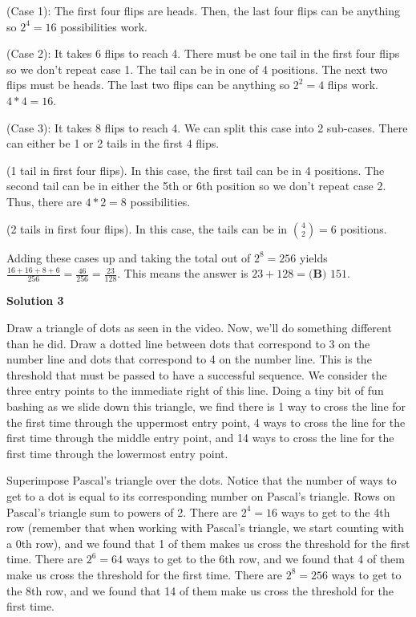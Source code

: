 \begin{enumerate}
 (Case 1): The first four flips are heads. Then, the last four flips can be anything so $2^4=16$ possibilities work. 

 (Case 2): It takes 6 flips to reach 4. There must be one tail in the first four flips so we don't repeat case 1. The tail can be in one of 4 positions. The next two flips must be heads. The last two flips can be anything so $2^2=4$ flips work. $4*4=16$. 

 (Case 3): It takes 8 flips to reach 4. We can split this case into 2 sub-cases. There can either be 1 or 2 tails in the first 4 flips. 

 (1 tail in first four flips). In this case, the first tail can be in 4 positions. The second tail can be in either the 5th or 6th position so we don't repeat case 2. Thus, there are $4*2=8$ possibilities.  

 (2 tails in first four flips). In this case, the tails can be in $\binom{4}{2}=6$ positions. 

 Adding these cases up and taking the total out of $2^8=256$ yields $\frac{16+16+8+6}{256}=\frac{46}{256}=\frac{23}{128}$. This means the answer is $23+128=\boxed{\textbf{(B) }151}$.

 



\textbf{Solution 3}

Draw a triangle of dots as seen in the video. Now, we'll do something different than he did. Draw a dotted line between dots that correspond to 3 on the number line and dots that correspond to 4 on the number line. This is the threshold that must be passed to have a successful sequence. We consider the three entry points to the immediate right of this line. Doing a tiny bit of fun bashing as we slide down this triangle, we find there is 1 way to cross the line for the first time through the uppermost entry point, 4 ways to cross the line for the first time through the middle entry point, and 14 ways to cross the line for the first time through the lowermost entry point.

 Superimpose Pascal's triangle over the dots. Notice that the number of ways to get to a dot is equal to its corresponding number on Pascal's triangle. Rows on Pascal's triangle sum to powers of 2. There are $2^4=16$ ways to get to the 4th row (remember that when working with Pascal's triangle, we start counting with a 0th row), and we found that 1 of them makes us cross the threshold for the first time. There are $2^6=64$ ways to get to the 6th row, and we found that 4 of them make us cross the threshold for the first time. There are $2^8=256$ ways to get to the 8th row, and we found that 14 of them make us cross the threshold for the first time.


\end{enumerate}
